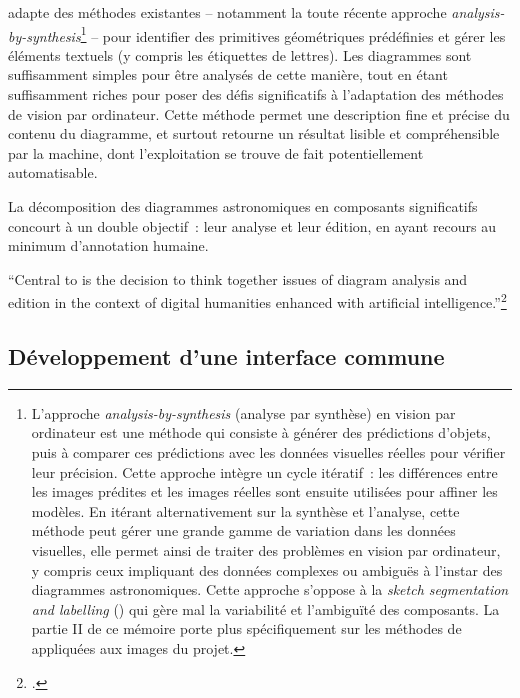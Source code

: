 \eida adapte des méthodes existantes -- notamment la toute récente
approche \textit{analysis-by-synthesis}\footnote{L'approche
  \emph{analysis-by-synthesis} (analyse par synthèse) en vision par
  ordinateur est une méthode qui consiste à générer des prédictions
  d'objets, puis à comparer ces prédictions avec les données visuelles
  réelles pour vérifier leur précision. Cette approche intègre un cycle
  itératif~: les différences entre les images prédites et les images
  réelles sont ensuite utilisées pour affiner les modèles. En itérant
  alternativement sur la synthèse et l'analyse, cette méthode peut gérer
  une grande gamme de variation dans les données visuelles, elle permet
  ainsi de traiter des problèmes en vision par ordinateur, y compris
  ceux impliquant des données complexes ou ambiguës à l'instar des
  diagrammes astronomiques. Cette approche s'oppose à la \emph{sketch
  segmentation and labelling} (\cite{ha_neural_2017}) qui gère mal la
  variabilité et l'ambiguïté des composants. La partie II de ce mémoire
  porte plus spécifiquement sur les méthodes de \cv
  appliquées aux images du projet.} -- pour identifier des primitives
géométriques prédéfinies et gérer les éléments textuels (y compris les
étiquettes de lettres). Les diagrammes sont suffisamment simples pour
être analysés de cette manière, tout en étant suffisamment riches pour
poser des défis significatifs à l'adaptation des méthodes de vision par
ordinateur. Cette méthode permet une description fine et précise du
contenu du diagramme, et surtout retourne un résultat lisible et
compréhensible par la machine, dont l'exploitation se trouve de fait
potentiellement automatisable.

La décomposition des diagrammes astronomiques en composants
significatifs concourt à un double objectif~: leur analyse et leur
édition, en ayant recours au minimum d'annotation humaine.

\begin{kwote}                     
``Central to \eida is the decision to think together issues of diagram
analysis and edition in the context of digital humanities enhanced with
artificial intelligence.''\footcite{husson_eida_2022}
\end{kwote}       

\hypertarget{developpement-dune-interface-commune}{%
\subsection{Développement d'une interface
commune}\label{developpement-dune-interface-commune}}

